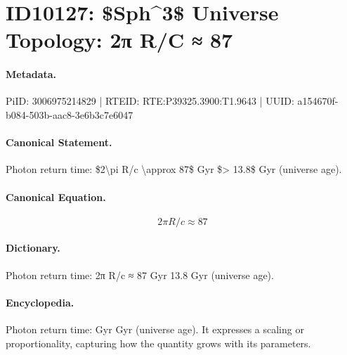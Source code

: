 \section*{ID10127: \$Sph\textasciicircum{}3\$ Universe Topology: 2π R/C ≈ 87}
\paragraph{Metadata.}
PiID: 3006975214829 | RTEID: RTE:P39325.3900:T1.9643 | UUID: a154670f-b084-503b-aac8-3e6b3c7e6047

\paragraph{Canonical Statement.}
Photon return time: \$2\textbackslash{}pi R/c \textbackslash{}approx 87\$ Gyr \$> 13.8\$ Gyr (universe age).

\paragraph{Canonical Equation.}
\[
2\pi R/c \approx 87
\]

\paragraph{Dictionary.}
Photon return time: 2π R/c ≈ 87 Gyr 13.8 Gyr (universe age).

\paragraph{Encyclopedia.}
Photon return time: Gyr Gyr (universe age). It expresses a scaling or proportionality, capturing how the quantity grows with its parameters.

